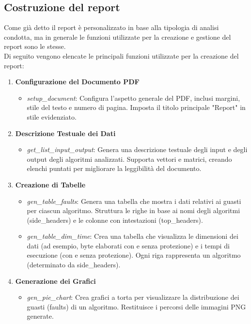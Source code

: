 \subsection{Costruzione del report}
Come già detto il report è personalizzato in base alla tipologia di analisi condotta, ma in generale le funzioni utilizzate per la creazione e gestione del report sono le stesse.\\
Di seguito vengono elencate le principali funzioni utilizzate per la creazione del report:
\begin{enumerate}[label=\Alph*.]
    \item \textbf{Configurazione del Documento PDF}
    \begin{itemize}
        \item \textit{setup\_document}: Configura l'aspetto generale del PDF, inclusi margini, stile del testo e numero di pagina. Imposta il titolo principale "Report" in stile evidenziato.
    \end{itemize}
    \item \textbf{Descrizione Testuale dei Dati}
    \begin{itemize}
        \item \textit{get\_list\_input\_output}: Genera una descrizione testuale degli input e degli output degli algoritmi analizzati. Supporta vettori e matrici, creando elenchi puntati per migliorare la leggibilità del documento.
    \end{itemize}
    \item \textbf{Creazione di Tabelle}
    \begin{itemize}
        \item \textit{gen\_table\_faults}: Genera una tabella che mostra i dati relativi ai guasti per ciascun algoritmo. Struttura le righe in base ai nomi degli algoritmi (side\_headers) e le colonne con intestazioni (top\_headers).
        \item \textit{gen\_table\_dim\_time}: Crea una tabella che visualizza le dimensioni dei dati (ad esempio, byte elaborati con e senza protezione) e i tempi di esecuzione (con e senza protezione). Ogni riga rappresenta un algoritmo (determinato da side\_headers).
    \end{itemize} 
    \item \textbf{Generazione dei Grafici}
    \begin{itemize}
        \item \textit{gen\_pie\_chart}: Crea grafici a torta per visualizzare la distribuzione dei guasti (faults) di un algoritmo. Restituisce i percorsi delle immagini PNG generate.

\end{itemize}
\end{enumerate}
